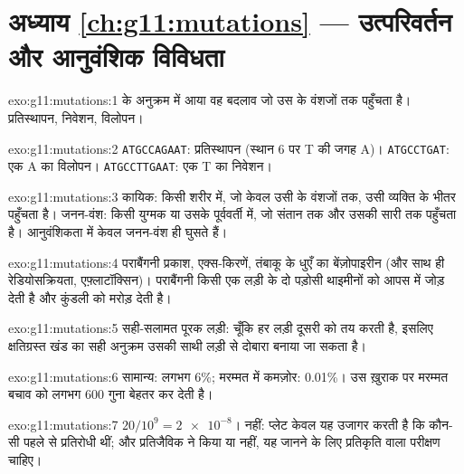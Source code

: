 \section*{अध्याय \ref{ch:g11:mutations} --- उत्परिवर्तन और आनुवंशिक विविधता}

\begin{solution}{exo:g11:mutations:1}
 के  अनुक्रम में आया वह बदलाव जो उस  के वंशजों तक
पहुँचता है। प्रतिस्थापन, निवेशन, विलोपन।
\end{solution}

\begin{solution}{exo:g11:mutations:2}
\texttt{ATGCCAGAAT}: प्रतिस्थापन (स्थान 6 पर T की जगह A)।
\texttt{ATGCCTGAT}: एक A का विलोपन। \texttt{ATGCCTTGAAT}: एक T का
निवेशन।
\end{solution}

\begin{solution}{exo:g11:mutations:3}
कायिक: किसी शरीर  में, जो केवल उसी  के वंशजों तक, उसी व्यक्ति
के भीतर पहुँचता है। जनन-वंश: किसी युग्मक या उसके पूर्ववर्ती में, जो संतान
तक और उसकी सारी  तक पहुँचता है। आनुवंशिकता में केवल जनन-वंश
 ही घुसते हैं।
\end{solution}

\begin{solution}{exo:g11:mutations:4}
पराबैंगनी प्रकाश, एक्स-किरणें, तंबाकू के धुएँ का बेंज़ोपाइरीन (और साथ ही
रेडियोसक्रियता, एफ़्लाटॉक्सिन)। पराबैंगनी किसी एक लड़ी के दो पड़ोसी
थाइमीनों को आपस में जोड़ देती है और कुंडली को मरोड़ देती है।
\end{solution}

\begin{solution}{exo:g11:mutations:5}
सही-सलामत पूरक लड़ी: चूँकि हर लड़ी दूसरी को तय करती है, इसलिए
क्षतिग्रस्त खंड का सही अनुक्रम उसकी साथी लड़ी से दोबारा बनाया जा सकता है।
\end{solution}

\begin{solution}{exo:g11:mutations:6}
सामान्य: लगभग 6\%; मरम्मत में कमज़ोर: 0.01\%। उस ख़ुराक पर मरम्मत बचाव को
लगभग 600 गुना बेहतर कर देती है।
\end{solution}

\begin{solution}{exo:g11:mutations:7}
$20/10^9 = \num{2e-8}$। नहीं: प्लेट केवल यह उजागर करती है कि कौन-सी
 पहले से प्रतिरोधी थीं; और  प्रतिजैविक ने किया या
नहीं, यह जानने के लिए प्रतिकृति वाला परीक्षण चाहिए।
\end{solution}

